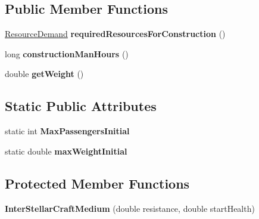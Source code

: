 \subsection*{Public Member Functions}
\begin{DoxyCompactItemize}
\item 
\hyperlink{classuniverse_1_1_resource_demand}{Resource\+Demand} {\bfseries required\+Resources\+For\+Construction} ()\hypertarget{classtools_1_1vehicles_1_1space_1_1_inter_stellar_craft_medium_a740c04ca10a1779d83cbd24e64b897de}{}\label{classtools_1_1vehicles_1_1space_1_1_inter_stellar_craft_medium_a740c04ca10a1779d83cbd24e64b897de}

\item 
long {\bfseries construction\+Man\+Hours} ()\hypertarget{classtools_1_1vehicles_1_1space_1_1_inter_stellar_craft_medium_a597923786a08e63ad49c139bf02d30e9}{}\label{classtools_1_1vehicles_1_1space_1_1_inter_stellar_craft_medium_a597923786a08e63ad49c139bf02d30e9}

\item 
double {\bfseries get\+Weight} ()\hypertarget{classtools_1_1vehicles_1_1space_1_1_inter_stellar_craft_medium_a0ec37f1cfd731d72204d5f42291008eb}{}\label{classtools_1_1vehicles_1_1space_1_1_inter_stellar_craft_medium_a0ec37f1cfd731d72204d5f42291008eb}

\end{DoxyCompactItemize}
\subsection*{Static Public Attributes}
\begin{DoxyCompactItemize}
\item 
static int {\bfseries Max\+Passengers\+Initial}\hypertarget{classtools_1_1vehicles_1_1space_1_1_inter_stellar_craft_medium_a8ba4b6094a4f7e0ca5420d717c70f617}{}\label{classtools_1_1vehicles_1_1space_1_1_inter_stellar_craft_medium_a8ba4b6094a4f7e0ca5420d717c70f617}

\item 
static double {\bfseries max\+Weight\+Initial}\hypertarget{classtools_1_1vehicles_1_1space_1_1_inter_stellar_craft_medium_a06801277542f26d1bfbdd10aeb4b4ade}{}\label{classtools_1_1vehicles_1_1space_1_1_inter_stellar_craft_medium_a06801277542f26d1bfbdd10aeb4b4ade}

\end{DoxyCompactItemize}
\subsection*{Protected Member Functions}
\begin{DoxyCompactItemize}
\item 
{\bfseries Inter\+Stellar\+Craft\+Medium} (double resistance, double start\+Health)\hypertarget{classtools_1_1vehicles_1_1space_1_1_inter_stellar_craft_medium_abc322a496b338edc7f3d687cbe9e04d2}{}\label{classtools_1_1vehicles_1_1space_1_1_inter_stellar_craft_medium_abc322a496b338edc7f3d687cbe9e04d2}

\end{DoxyCompactItemize}
